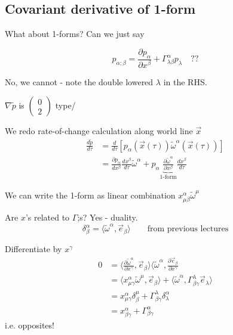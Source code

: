 \documentclass[a4paper]{article} %
\newcommand{\pmx}[1]{
\begin{pmatrix}
#1
\end{pmatrix}
}
\renewcommand{\tilde}{\widetilde}
\begin{document}
\subsection{Covariant derivative of 1-form}
What about 1-forms? Can we just say

\begin{equation*}
p_{\alpha;\beta}=\frac{\partial p_{\alpha}}{\partial x^{\beta}}
+\Gamma^{\alpha}_{\lambda\beta}p_{\lambda}\quad \text{??}
\end{equation*}

No, we cannot - note the double lowered $\lambda$ in the RHS.

$\nabla\tilde{p}$ is $\pmx{0\\2}$ type/

We redo rate-of-change calculation along world line $\vec{x}$
\begin{align}
\frac{d\tilde{p}}{d\tau}&=\frac{d}{d\tau}\left[p_{\alpha}(\vec{x}(\tau))\tilde{\omega}^{\alpha}(\vec{x}(\tau))\right]\\
&=\frac{\partial p_{\alpha}}{dx^{\beta}}\frac{dx^{\beta}}{d\tau}\tilde{\omega}^{\alpha}+p_{\alpha}\underbrace{\frac{\partial \tilde{\omega}^{\alpha}}{\partial x^{\beta}}}_{\text{1-form}}
\frac{dx^{\beta}}{d\tau}
\end{align}

We can write the 1-form as linear combination $x_{\mu\beta}^{\alpha}\tilde{\omega}^{\mu}$

Are $x$'s related to $\Gamma$;s? Yes - duality.
\begin{equation}
\delta ^{\alpha}_{\beta}=\langle \tilde{\omega}^{\alpha},\vec{e}_{\beta}\rangle\qquad \text{from previous lectures}
\end{equation}

Differentiate by $x^{\gamma}$
\begin{align}
0&=\langle\frac{\partial\tilde{\omega}^{\alpha}}{\partial x^{\gamma}},\vec{e}_{\beta}\rangle 
\langle \tilde{\omega}^{\alpha},\frac{\partial \vec{e}_{\beta}}{\partial x^{\gamma}}\\
&=\langle x_{\mu\gamma}^{\alpha}\tilde{\omega}^{\mu},\vec{e}_{\beta}\rangle +\langle\tilde{\omega}^{\alpha},\Gamma^{\lambda}_{\beta\gamma}\vec{e}_{\lambda}\rangle\\
&=x^{\alpha}_{\mu\gamma}\delta^{\mu}_{\beta}
+\Gamma^{\lambda}_{\beta\gamma}\delta^{\alpha}_{\lambda}\\
&=x^{\alpha}_{\beta\gamma}+\Gamma^{\alpha}_{\beta\gamma}
\end{align}
i.e. opposites!
\end{document}

